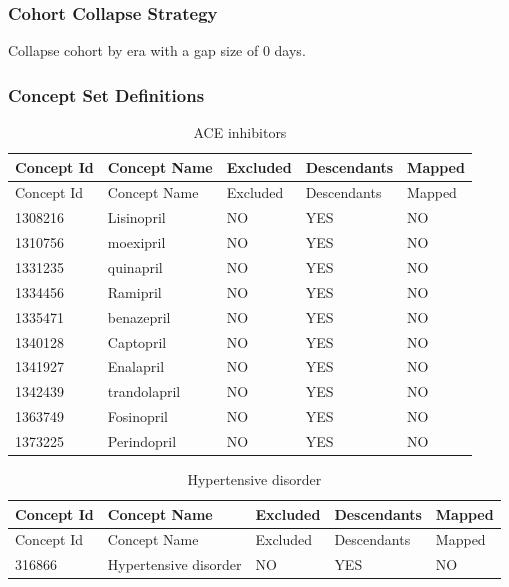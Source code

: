 \documentclass[10.5pt]{book}
\theoremstyle{definition}
\theoremstyle{definition}
\theoremstyle{definition}
\theoremstyle{remark}
\begin{document}
\subsubsection*{Cohort Collapse
Strategy}\label{cohort-collapse-strategy-1}

Collapse cohort by era with a gap size of 0 days.

\subsubsection*{Concept Set
Definitions}\label{concept-set-definitions-1}

\begin{longtable}[]{@{}lllll@{}}
\caption{\label{tab:aceInhibitorsMono} ACE inhibitors}\tabularnewline
\toprule
Concept Id & Concept Name & Excluded & Descendants &
Mapped\tabularnewline
\midrule
\endfirsthead
\toprule
Concept Id & Concept Name & Excluded & Descendants &
Mapped\tabularnewline
\midrule
\endhead
1308216 & Lisinopril & NO & YES & NO\tabularnewline
1310756 & moexipril & NO & YES & NO\tabularnewline
1331235 & quinapril & NO & YES & NO\tabularnewline
1334456 & Ramipril & NO & YES & NO\tabularnewline
1335471 & benazepril & NO & YES & NO\tabularnewline
1340128 & Captopril & NO & YES & NO\tabularnewline
1341927 & Enalapril & NO & YES & NO\tabularnewline
1342439 & trandolapril & NO & YES & NO\tabularnewline
1363749 & Fosinopril & NO & YES & NO\tabularnewline
1373225 & Perindopril & NO & YES & NO\tabularnewline
\bottomrule
\end{longtable}

\begin{longtable}[]{@{}lllll@{}}
\caption{\label{tab:hypertensionAceMono} Hypertensive
disorder}\tabularnewline
\toprule
Concept Id & Concept Name & Excluded & Descendants &
Mapped\tabularnewline
\midrule
\endfirsthead
\toprule
Concept Id & Concept Name & Excluded & Descendants &
Mapped\tabularnewline
\midrule
\endhead
316866 & Hypertensive disorder & NO & YES & NO\tabularnewline
\bottomrule
\end{longtable}
\end{document}

